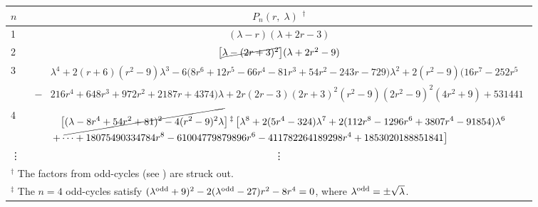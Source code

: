 \documentclass{ws-ijbc}
\begin{document}
\begin{table}[h]\footnotesize
{
\begin{tabular}{lc}
\hline
  $n$
& $P_n(r, \; \lambda)$ $^\dagger$
\\
\hline
1
&
$(\lambda - r) (\lambda + 2 r - 3)$
\\
2
&
  $
  \big[
  \cancel{\lambda - (2r+3)^2}
  \big]
  (\lambda + 2r^2 - 9)
  $
\\
3
&
$\begin{aligned}
  &\lambda^4
  + 2 (r+6)(r^2-9) \lambda^3
  -6 \big(8 r^6+12 r^5-66 r^4-81 r^3+54 r^2-243 r-729\big)
  \lambda^2
+2 (r^2-9) \big(16 r^7-252 r^5\\
-&216 r^4 +648 r^3+972 r^2+2187 r+4374\big) \lambda
+2 r (2r-3) (2 r+3)^2 (r^2-9) (2 r^2 - 9)^2 (4 r^2+9) + 531441
\end{aligned}$
\\
4
&
\begin{minipage}{.97\linewidth}
\vspace*{1mm}
$\begin{aligned}
&\big[ \cancel{
  (\lambda-8r^4+54r^2+81)^2
-4 (r^2-9)^2 \lambda
} \big]
\,^\ddagger\,
\big[
\lambda^8
+2(5 r^4-324) \lambda^7
+2(112 r^8-1296 r^6+3807 r^4-91854) \lambda^6 \\
+&\dots
+18075490334784 r^8
-61004779879896 r^6
-411782264189298 r^4
+1853020188851841
\big]
\end{aligned}$
\end{minipage}
\\
\vdots & \vdots
\\
\hline
\multicolumn{2}{p{\textwidth}}{
$^\dagger$
The factors from odd-cycles (see {oddcycle}) are struck out.
}\\
\multicolumn{2}{p{\textwidth}}{
$^\ddagger$
The $n = 4$ odd-cycles satisfy
$(\lambda^{\mathrm{odd}} + 9)^2 - 2(\lambda^{\mathrm{odd}}-27) r^2 - 8 r^4 = 0$,
  where $\lambda^{\mathrm{odd}}=\pm\sqrt\lambda$.
} \\
\hline
\end{tabular}
\label{tab:cubpolygen}
}
\end{table}
\end{document}
